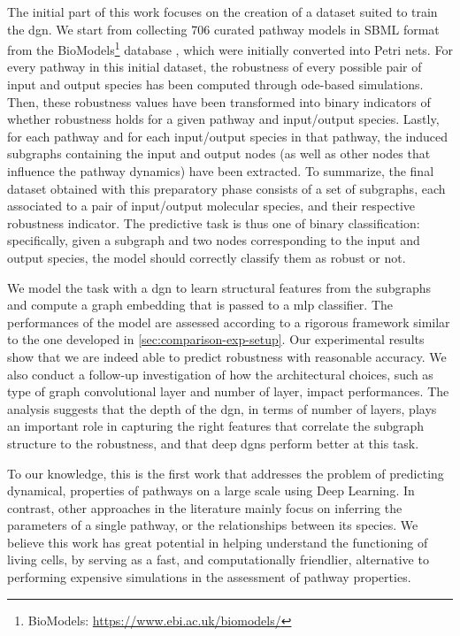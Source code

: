 The initial part of this work focuses on the creation of a dataset suited to train the \gls{dgn}. We start from collecting 706 curated pathway models in SBML format from the BioModels\footnote{BioModels: \url{https://www.ebi.ac.uk/biomodels/}} database \citep{li2010biomodels}, which were initially converted into Petri nets. For every pathway in this initial dataset, the robustness of every possible pair of input and output species has been computed through \gls{ode}-based simulations. Then, these robustness values have been transformed into binary indicators of whether robustness holds for a given pathway and input/output species. Lastly, for each pathway and for each input/output species in that pathway, the induced subgraphs containing the input and output nodes (as well as other nodes that influence the pathway dynamics) have been extracted. To summarize, the final dataset obtained with this preparatory phase consists of a set of subgraphs, each associated to a pair of input/output molecular species, and their respective robustness indicator. The predictive task is thus one of binary classification: specifically, given a subgraph and two nodes corresponding to the input and output species, the model should correctly classify them as robust or not.

We model the task with a \gls{dgn} to learn structural features from the subgraphs and compute a graph embedding that is passed to a \gls{mlp} classifier. The performances of the model are assessed according to a rigorous framework similar to the one developed in \ref{sec:comparison-exp-setup}. Our experimental results show that we are indeed able to predict robustness with reasonable accuracy. We also conduct a follow-up investigation of how the architectural choices, such as type of graph convolutional layer and number of layer, impact performances. The analysis suggests that the depth of the \gls{dgn}, in terms of number of layers, plays an important role in capturing the right features that correlate the subgraph structure to the robustness, and that deep \glspl{dgn} perform better at this task.

To our knowledge, this is the first work that addresses the problem of predicting dynamical, properties of pathways on a large scale using Deep Learning. In contrast, other approaches in the literature mainly focus on inferring the parameters of a single pathway, or the relationships between its species. We believe this work has great potential in helping understand the functioning of living cells, by serving as a fast, and computationally friendlier, alternative to performing expensive simulations in the assessment of pathway properties.

